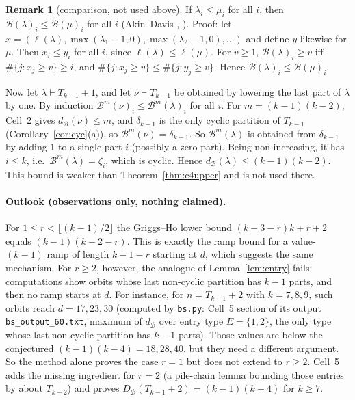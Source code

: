 \documentclass[11pt]{article}
\theoremstyle{definition}
\newtheorem{remark}[theorem]{Remark}
\newcommand{\B}{\mathcal{B}}
\newcommand{\dB}{d_{\mathcal{B}}}
\newcommand{\DB}{D_{\mathcal{B}}}
\renewcommand{\le}{\leqslant}
\renewcommand{\ge}{\geqslant}
\begin{document}
\begin{remark}[comparison, not used above]\label{rem:comparison}
If $\lambda_i\le\mu_i$ for all $i$, then $\B(\lambda)_i\le\B(\mu)_i$ for all $i$ (Akin--Davis \cite[Thm.~3(c)]{AD},
\cite[Thm.~4.1]{GH}).  Proof: let $x=(\ell(\lambda),\max(\lambda_1-1,0),\max(\lambda_2-1,0),\dots)$ and define $y$ likewise for
$\mu$.  Then $x_i\le y_i$ for all $i$, since $\ell(\lambda)\le\ell(\mu)$.  For $v\ge1$, $\B(\lambda)_i\ge v$ iff
$\#\{j:x_j\ge v\}\ge i$, and $\#\{j:x_j\ge v\}\le\#\{j:y_j\ge v\}$.  Hence $\B(\lambda)_i\le\B(\mu)_i$.

Now let $\lambda\vdash T_{k-1}+1$, and let $\nu\vdash T_{k-1}$ be obtained by lowering the last part of $\lambda$ by one.
By induction $\B^m(\nu)_i\le\B^m(\lambda)_i$ for all $i$.  For $m=(k-1)(k-2)$, Cell~2 gives $\dB(\nu)\le m$, and $\delta_{k-1}$ is the only cyclic partition of $T_{k-1}$
(Corollary~\ref{cor:cyc}(a)), so $\B^m(\nu)=\delta_{k-1}$.
So $\B^m(\lambda)$ is obtained from $\delta_{k-1}$ by adding $1$ to a single part $i$ (possibly a zero part).
Being non-increasing, it has $i\le k$, i.e.\ $\B^m(\lambda)=\zeta_i$, which is cyclic.  Hence
$\dB(\lambda)\le(k-1)(k-2)$.  This bound is weaker than Theorem~\ref{thm:c4upper} and is not used there.
\end{remark}

\paragraph{Outlook (observations only, nothing claimed).}  For $1\le r<\lfloor(k-1)/2\rfloor$ the
Griggs--Ho lower bound $(k-3-r)k+r+2$ equals $(k-1)(k-2-r)$.  This is exactly the ramp bound for a
value-$(k-1)$ ramp of length $k-1-r$ starting at $d$, which suggests the same mechanism.  For $r\ge2$,
however, the analogue of Lemma~\ref{lem:entry} fails: computations show orbits whose last non-cyclic
partition has $k-1$ parts, and then no ramp starts at $d$.  For instance, for $n=T_{k-1}+2$ with $k=7,8,9$,
such orbits reach $d=17,23,30$ (computed by \texttt{bs.py}: Cell~5 section of its output
\texttt{bs\_output\_60.txt}, maximum of $\dB$ over entry type $E=\{1,2\}$, the only type whose last
non-cyclic partition has $k-1$ parts).  Those values are below the conjectured $(k-1)(k-4)=18,28,40$, but they need
a different argument.  So the method alone proves the case $r=1$ but does not extend to $r\ge2$.  Cell~5 adds the missing ingredient for
$r=2$ (a pile-chain lemma bounding those entries by about $T_{k-2}$) and proves $\DB(T_{k-1}+2)=(k-1)(k-4)$ for $k\ge7$.
\end{document}
